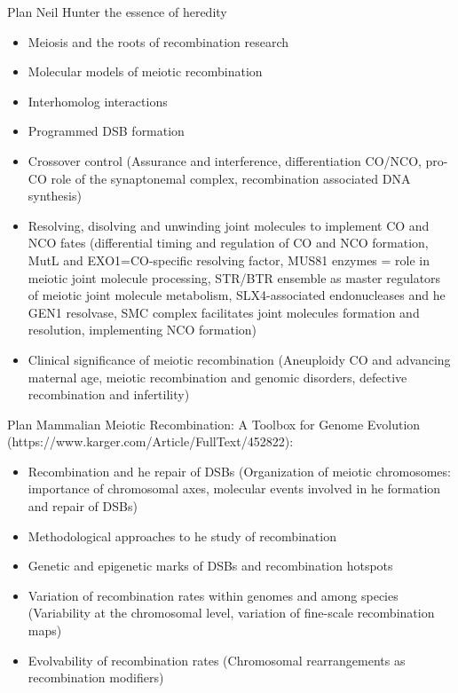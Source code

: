 Plan Neil Hunter the essence of heredity
\begin{itemize}
	\item Meiosis and the roots of recombination research
	\item Molecular models of meiotic recombination
	\item Interhomolog interactions
	\item Programmed DSB formation
	\item Crossover control (Assurance and interference, differentiation CO/NCO, pro-CO role of the synaptonemal complex, recombination associated DNA synthesis)
	\item Resolving, disolving and unwinding joint molecules to implement CO and NCO fates (differential timing and regulation of CO and NCO formation, MutL and EXO1=CO-specific resolving factor, MUS81 enzymes = role in meiotic joint molecule processing, STR/BTR ensemble as master regulators of meiotic joint molecule metabolism, SLX4-associated endonucleases and he GEN1 resolvase, SMC complex facilitates joint molecules formation and resolution, implementing NCO formation)
	\item Clinical significance of meiotic recombination (Aneuploidy CO and advancing maternal age, meiotic recombination and genomic disorders, defective recombination and infertility)


\end{itemize}

Plan Mammalian Meiotic Recombination: A Toolbox for Genome Evolution (https://www.karger.com/Article/FullText/452822):
\begin{itemize}
	\item Recombination and he repair of DSBs (Organization of meiotic chromosomes: importance of chromosomal axes, molecular events involved in he formation and repair of DSBs)
	\item Methodological approaches to he study of recombination
	\item Genetic and epigenetic marks of DSBs and recombination hotspots 
	\item Variation of recombination rates within genomes and among species (Variability at the chromosomal level, variation of fine-scale recombination maps)
	\item Evolvability of recombination rates (Chromosomal rearrangements as recombination modifiers)
\end{itemize}


